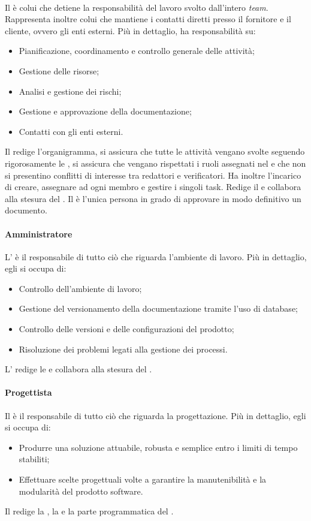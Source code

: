 \paragraph{\RdP}
Il \textsl{\RdP} è colui che detiene la responsabilità del 
lavoro svolto dall'intero \textit{team}. Rappresenta inoltre colui che mantiene i 
contatti diretti presso il fornitore e il cliente, ovvero gli enti esterni. Più 
in dettaglio, ha responsabilità su:
\begin{itemize}
  \item Pianificazione, coordinamento e controllo generale delle attività;
  \item Gestione delle risorse;
  \item Analisi e gestione dei rischi;
  \item Gestione e approvazione della documentazione;
  \item Contatti con gli enti esterni.
\end{itemize}
Il \textsl{\RdP} redige l'organigramma, si assicura che 
tutte le attività vengano svolte seguendo rigorosamente le \textsl{\NdP}, si 
assicura che vengano rispettati i ruoli assegnati nel \textsl{\PdP} e che non si 
presentino conflitti di interesse tra redattori e verificatori. Ha inoltre 
l'incarico di creare, assegnare ad ogni membro e gestire i singoli task. Redige 
il \textsl{\PdP} e collabora alla stesura del \textsl{\PdQ}. Il \textsl{\RdP} è 
l'unica persona in grado di approvare in modo definitivo un documento.

\paragraph{Amministratore}
L'\textsl{\Amm} è il responsabile di tutto ciò che riguarda l'ambiente di 
lavoro. Più in dettaglio, egli si occupa di:
\begin{itemize}
  \item Controllo dell'ambiente di lavoro;
  \item Gestione del versionamento della documentazione tramite l'uso di 
  database;
  \item Controllo delle versioni e delle configurazioni del prodotto;
  \item Risoluzione dei problemi legati alla gestione dei processi.
\end{itemize}
L'\textsl{\Amm} redige le \textsl{\NdP} e collabora alla stesura del 
\textsl{\PdP}.

\paragraph{Progettista}
Il \textsl{\Prog} è il responsabile di tutto ciò che riguarda la progettazione. 
Più in dettaglio, egli si occupa di:
\begin{itemize}
  \item Produrre una soluzione attuabile, robusta e semplice entro i limiti di 
  tempo stabiliti;
  \item Effettuare scelte progettuali volte a garantire la manutenibilità e la 
  modularità del prodotto software.
\end{itemize}
Il \textsl{\Prog} redige la \textsl{\ST}, la \textsl{\DDP} e la parte 
programmatica del \textsl{\PdQ}.

